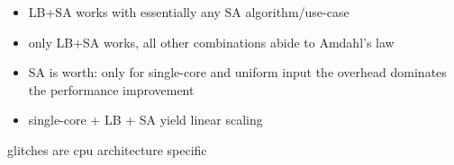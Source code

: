 \begin{itemize}
\item LB+SA works with essentially any SA algorithm/use-case
\item only LB+SA works, all other combinations abide to Amdahl's law
\item SA is worth: only for single-core and uniform input the overhead dominates the performance improvement
\item single-core + LB + SA yield linear scaling
\end{itemize}


glitches are cpu architecture specific

%









